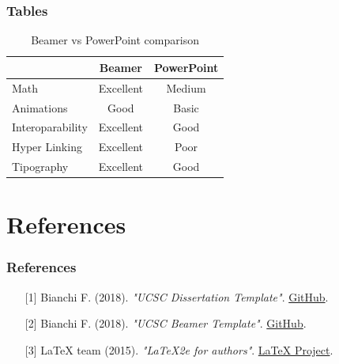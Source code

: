 \documentclass[11pt, xcolor=dvipsnames]{beamer}
\begin{document}
\begin{frame}
\frametitle{Tables}	
\begin{table}[]
\centering
\caption{Beamer vs PowerPoint comparison}
\label{my-label}
\begin{tabular}{@{}lcc@{}}
\toprule
\textbf{} & \textbf{Beamer} & \textbf{PowerPoint} \\ \midrule
Math & Excellent & Medium \\
Animations & Good & Basic \\
Interoparability & Excellent & Good \\
Hyper Linking & \multicolumn{1}{l}{Excellent} & Poor \\
Tipography & \multicolumn{1}{l}{Excellent} & Good \\ \bottomrule
\end{tabular}
\end{table}
\end{frame}

\section{References}

\begin{frame}
\frametitle{References}
\small
\begin{enumerate}
\item[{[1]}] Bianchi F. (2018). \textit{"UCSC Dissertation Template"}. \href{https://github.com/Francesco-Bianchi/UCSC_dissertation_template}{GitHub}.
\item[{[2]}] Bianchi F. (2018). \textit{"UCSC Beamer Template"}. \href{https://github.com/Francesco-Bianchi/UCSC_beamer_template}{GitHub}.
\item[{[3]}] LaTeX team (2015). \textit{"LaTeX2e for authors"}. \href{https://www.latex-project.org/help/documentation/usrguide.pdf}{LaTeX Project}.
\end{enumerate}
\end{frame}
\end{document}
